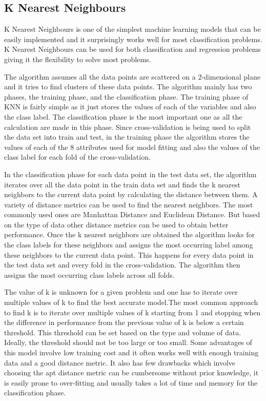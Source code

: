 \documentclass[sigconf]{acmart}
\begin{document}
\subsection{K Nearest Neighbours}

K Nearest Neighbours is one of the simplest machine learning models that can be easily implemented and it surprisingly works well for most classification problems. K Nearest Neighbours can be used for both classification and regression problems giving it the flexibility to solve most problems.

The algorithm assumes all the data points are scattered on a 2-dimensional plane and it tries to find clusters of these data points. The algorithm mainly has two phases, the training phase, and the classification phase. The training phase of KNN is fairly simple as it just stores the values of each of the variables and also the class label. The classification phase is the most important one as all the calculation are made in this phase. Since cross-validation is being used to split the data set into train and test, in the training phase the algorithm stores the values of each of the 8 attributes used for model fitting and also the values of the class label for each fold of the cross-validation.

In the classification phase for each data point in the test data set, the algorithm iterates over all the data point in the train data set and finds the k nearest neighbors to the current data point by calculating the distance between them. A variety of distance metrics can be used to find the nearest neighbors. The most commonly used ones are Manhattan Distance and Euclidean Distance. But based on the type of data other distance metrics can be used to obtain better performance. Once the k nearest neighbors are obtained the algorithm looks for the class labels for these neighbors and assigns the most occurring label among these neighbors to the current data point. This happens for every data point in the test data set and every fold in the cross-validation. The algorithm then assigns the most occurring class labels across all folds.

The value of k is unknown for a given problem and one has to iterate over multiple values of k to find the best accurate model.The most common approach to find k is to iterate over multiple values of k starting from 1 and stopping when the difference in performance from the previous value of k is below a certain threshold. This threshold can be set based on the type and volume of data. Ideally, the threshold should not be too large or too small. Some advantages of this model involve low training cost and it often works well with enough training data and a good distance metric. It also has few drawbacks which involve choosing the apt distance metric can be cumbersome without prior knowledge, it is easily prone to over-fitting and usually takes a lot of time and memory for the classification phase.
\end{document}
